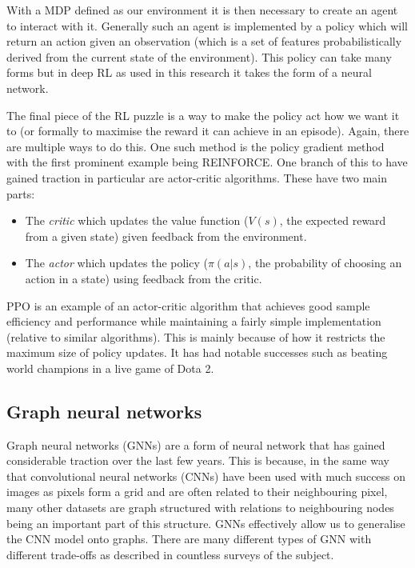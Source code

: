 With a MDP defined as our environment it is then necessary to create an agent to interact with it. Generally such an agent is implemented by a policy which will return an action given an observation (which is a set of features probabilistically derived from the current state of the environment). This policy can take many forms but in deep RL as used in this research it takes the form of a neural network.

The final piece of the RL puzzle is a way to make the policy act how we want it to (or formally to maximise the reward it can achieve in an episode). Again, there are multiple ways to do this. One such method is the policy gradient method with the first prominent example being REINFORCE\cite{williams1992simple}. One branch of this to have gained traction in particular are actor-critic algorithms. These have two main parts:

\begin{itemize}
    \item The \emph{critic} which updates the value function ($V(s)$, the expected reward from a given state) given feedback from the environment.
    \item The \emph{actor} which updates the policy ($\pi(a|s)$, the probability of choosing an action in a state) using feedback from the critic.
\end{itemize}

PPO\cite{schulman2017proximal} is an example of an actor-critic algorithm that achieves good sample efficiency and performance while maintaining a fairly simple implementation (relative to similar algorithms). This is mainly because of how it restricts the maximum size of policy updates. It has had notable successes such as beating world champions in a live game of Dota 2\cite{openai2019dota}.

\subsection{Graph neural networks}

Graph neural networks (GNNs)\cite{gori2005new,scarselli2008graph} are a form of neural network that has gained considerable 
traction over the last few years. This is because, in the same way that convolutional neural networks (CNNs) have been used with much success on images as pixels form a grid and are often related to their neighbouring pixel, many other datasets are graph structured with relations to neighbouring nodes being an important part of this structure. GNNs effectively allow us to generalise the CNN model onto graphs.  There are many different types of GNN with different trade-offs as described in countless surveys of the subject\cite{zhou2018graph,Wu_2020}.

